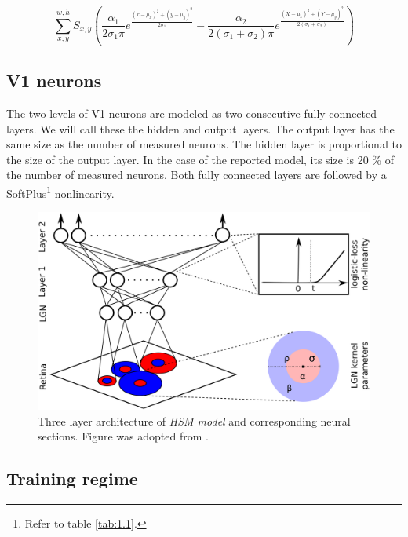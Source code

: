 \begin{equation}\label{eq:2.1}
    \sum_{x,y}^{w,h} S_{x,y}
(
{\frac{\alpha_1}{ 2 \sigma_1 \pi}} e^{\frac{(x - \mu_x)^2 + (y - \mu_y)^2}{2\sigma_1}} -
{\frac{\alpha_2}{2 (\sigma_1+\sigma_2) \pi}} e^{\frac{(X - \mu_x)^2 + (Y - \mu_y)^2}{ 2(\sigma_1+\sigma_2) }}
)
\end{equation}

\subsection{V1 neurons}
The two levels of V1 neurons are modeled as two consecutive fully connected layers. We will call these the hidden and output layers. The output layer has the same size as the number of measured neurons. The hidden layer is proportional to the size of the output layer. In the case of the reported model, its size is 20 \% of the number of measured neurons. Both fully connected layers are followed by a SoftPlus\footnote{Refer to table \ref{tab:1.1}.} nonlinearity.

\begin{figure}[h]
    \centering
    \includegraphics[width=1\textwidth]{../figures/02_HSM}
    \caption[HSM model architecture]{Three layer architecture of \textit{HSM model} and corresponding neural sections. Figure was adopted from \citep{antolik}.}
    \label{fig:2.1}
\end{figure}

\subsection{Training regime}\label{ch:2.1.3}

